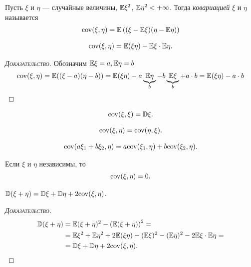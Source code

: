 \documentclass[../main.tex]{subfiles}
\begin{document}
   \begin{df}[ковариация]
    Пусть $ \xi $ и $ \eta $ --- случайные величины, $ \mathbb E\xi^{2} $, $ \mathbb E\eta^{2} < +\infty$. Тогда \textit{ковариацией} $ \xi $ и $ \eta $ называется
    \begin{align*}
     \mathrm{cov}(\xi,\eta) = \mathbb E \left( (\xi - \mathbb E\xi)(\eta - \mathbb E\eta) \right)
    \end{align*} 
   \end{df}
   \begin{prop}
    \begin{align*}
     \mathrm{cov}(\xi,\eta) = \mathbb E(\xi\eta) - \mathbb E\xi \cdot \mathbb E\eta.
    \end{align*} 
   \end{prop}
   \begin{proof}[\normalfont\textsc{Доказательство}]
    Обозначим $\mathbb E \xi = a, \mathbb E \eta = b$ 
    \begin{align*}
     \mathrm{cov}(\xi, \eta) = \mathbb E((\xi - a)(\eta - b)) = \mathbb E(\xi \eta) - a\underbrace{\mathbb E\eta}_b -b\underbrace{\mathbb E\xi}_b + a \cdot b = \mathbb E(\xi \eta) - a \cdot b
    \end{align*}
   \end{proof}
   \begin{prop}
    \begin{align*}
     \mathrm{cov}(\xi,\xi) = \mathbb D\xi.
    \end{align*} 
   \end{prop}
   \begin{prop}
    \begin{align*}
     \mathrm{cov}(\xi,\eta) = \mathrm{cov}(\eta,\xi).
    \end{align*}
   \end{prop}
   \begin{prop}
    \begin{align*}
     \mathrm{cov}(a\xi_1 + b\xi_2, \eta) = a\mathrm{cov}(\xi_1,\eta) + b \mathrm{cov}(\xi_2, \eta).
    \end{align*} 
   \end{prop}
   \begin{prop}
    Если $ \xi $ и $ \eta $ независимы, то
    \begin{align*}
     \mathrm{cov}(\xi,\eta) = 0.
    \end{align*} 
   \end{prop}
   \begin{prop}
    $ \mathbb D(\xi + \eta) = \mathbb D\xi + \mathbb D\eta + 2\mathrm{cov}(\xi,\eta) $.
   \end{prop}
   \begin{proof}[\normalfont\textsc{Доказательство}]
    \begin{align*}
     \mathbb D(\xi+\eta) &= \mathbb E(\xi+\eta)^{2} - \left( \mathbb E(\xi+\eta) \right)^{2} = \\
     &= \mathbb E\xi^{2} + \mathbb E\eta^{2} + 2\mathbb E(\xi\eta) - (\mathbb E\xi)^{2} - (\mathbb E\eta)^{2} - 2\mathbb E\xi \cdot \mathbb E\eta = \\
     &= \mathbb D\xi + \mathbb D\eta +2\mathrm{cov}(\xi,\eta).
    \end{align*} 
   \end{proof}
\end{document}
